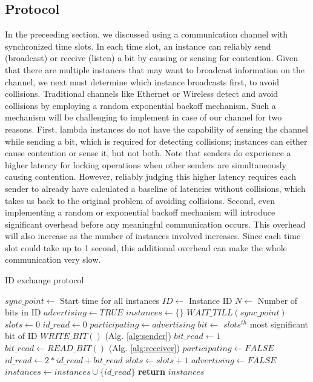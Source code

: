 \subsection{Protocol}
\label{sec:protocol}
In the preceeding section, we discussed using a communication channel with
synchronized time slots. In each time slot, an instance can reliably send
(broadcast) or receive (listen) a bit by causing or sensing for contention.
Given that there are multiple instances that may want to broadcast information
on the channel, we next must determine which instance broadcasts first, to avoid
collisions. Traditional channels like Ethernet or Wireless detect and avoid
collisions by employing a random exponential backoff mechanism.
Such a mechanism will be challenging to implement in case of our channel for two
reasons. First, lambda instances do not have the capability of sensing the
channel while sending a bit, which is required for detecting collisions;
instances can either cause contention or sense it, but not both. Note that
senders do experience a higher latency for locking operations when other senders
are simultaneously causing contention. However, reliably judging this higher
latency requires each sender to already have calculated a baseline of latencies
without collisions, which takes us back to the original problem of avoiding collisions. 
Second, even implementing a
random or exponential backoff mechanism will introduce significant overhead before any
meaningful communication occurs. This overhead will also increase as the number
of instances involved increases. Since each time slot could take up to 1 second, this
additional overhead can make the whole communication very slow.


\begin{algorithm}[!t]
\caption{ID exchange protocol }
\label{alg:protcol}
\begin{algorithmic}[1]
\STATE $sync\_point \leftarrow$ {Start time for all instances}
\STATE $ID \leftarrow$ {Instance ID}
\STATE $N \leftarrow$ {Number of bits in ID}
\STATE $advertising \leftarrow TRUE$
\STATE $instances \leftarrow \{\} $
\STATE $WAIT\_TILL(sync\_point)$
    \STATE $slots \leftarrow 0$
    \STATE $id\_read \leftarrow 0$
    \STATE $participating \leftarrow advertising$
        \STATE $bit \leftarrow$ {$slots^{th}$ most significant bit of ID}
            \STATE $WRITE\_BIT()$               (Alg. \ref{alg:sender})
            \STATE $bit\_read \leftarrow 1$
        \ELSE
            \STATE $bit\_read \leftarrow READ\_BIT()$       (Alg. \ref{alg:receiver})
                \STATE $participating \leftarrow FALSE$
            \ENDIF
        \ENDIF
        \STATE $id\_read \leftarrow 2 * id\_read + bit\_read$
        \STATE $slots \leftarrow slots + 1$
    \ENDWHILE
        \STATE $advertising \leftarrow FALSE$
    \ENDIF
    \STATE $instances \leftarrow instances \cup \{id\_read\}$
\ENDWHILE
\STATE \textbf{return} $instances$
\end{algorithmic}
\end{algorithm}

